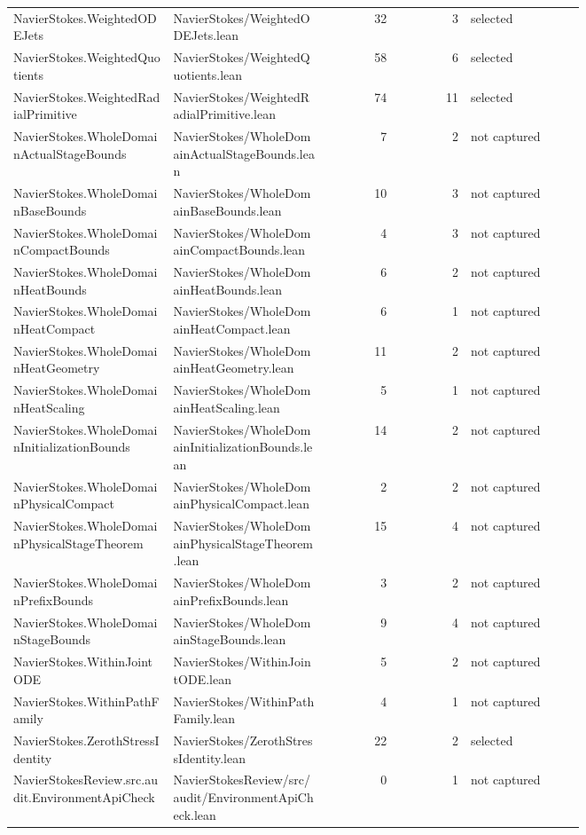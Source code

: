 \documentclass[10pt]{article}
\begin{document}
\begin{longtable}{p{0.28\linewidth}p{0.27\linewidth}r r p{0.20\linewidth}}
NavierStokes.WeightedODEJets & NavierStokes/WeightedODEJets.lean & 32 & 3 & selected\\
NavierStokes.WeightedQuotients & NavierStokes/WeightedQuotients.lean & 58 & 6 & selected\\
NavierStokes.WeightedRadialPrimitive & NavierStokes/WeightedRadialPrimitive.lean & 74 & 11 & selected\\
NavierStokes.WholeDomainActualStageBounds & NavierStokes/WholeDomainActualStageBounds.lean & 7 & 2 & not captured\\
NavierStokes.WholeDomainBaseBounds & NavierStokes/WholeDomainBaseBounds.lean & 10 & 3 & not captured\\
NavierStokes.WholeDomainCompactBounds & NavierStokes/WholeDomainCompactBounds.lean & 4 & 3 & not captured\\
NavierStokes.WholeDomainHeatBounds & NavierStokes/WholeDomainHeatBounds.lean & 6 & 2 & not captured\\
NavierStokes.WholeDomainHeatCompact & NavierStokes/WholeDomainHeatCompact.lean & 6 & 1 & not captured\\
NavierStokes.WholeDomainHeatGeometry & NavierStokes/WholeDomainHeatGeometry.lean & 11 & 2 & not captured\\
NavierStokes.WholeDomainHeatScaling & NavierStokes/WholeDomainHeatScaling.lean & 5 & 1 & not captured\\
NavierStokes.WholeDomainInitializationBounds & NavierStokes/WholeDomainInitializationBounds.lean & 14 & 2 & not captured\\
NavierStokes.WholeDomainPhysicalCompact & NavierStokes/WholeDomainPhysicalCompact.lean & 2 & 2 & not captured\\
NavierStokes.WholeDomainPhysicalStageTheorem & NavierStokes/WholeDomainPhysicalStageTheorem.lean & 15 & 4 & not captured\\
NavierStokes.WholeDomainPrefixBounds & NavierStokes/WholeDomainPrefixBounds.lean & 3 & 2 & not captured\\
NavierStokes.WholeDomainStageBounds & NavierStokes/WholeDomainStageBounds.lean & 9 & 4 & not captured\\
NavierStokes.WithinJointODE & NavierStokes/WithinJointODE.lean & 5 & 2 & not captured\\
NavierStokes.WithinPathFamily & NavierStokes/WithinPathFamily.lean & 4 & 1 & not captured\\
NavierStokes.ZerothStressIdentity & NavierStokes/ZerothStressIdentity.lean & 22 & 2 & selected\\
NavierStokesReview.src.audit.EnvironmentApiCheck & NavierStokesReview/src/audit/EnvironmentApiCheck.lean & 0 & 1 & not captured\\

\end{longtable}
\end{document}

